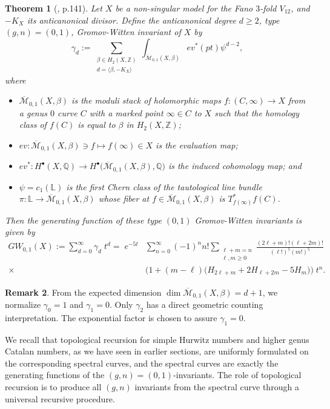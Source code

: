 \documentclass{amsart}
\newtheorem{thm}{Theorem}[section]
\theoremstyle{definition}
\newtheorem{rem}[thm]{Remark}
\numberwithin{equation}{section}
\numberwithin{figure}{section}
\def\b{\beta}
\def\gam{\gamma}
\newcommand{\be}{\begin{equation}}
\newcommand{\ee}{\end{equation}}
\newcommand{\Mbar}{{\overline{\mathcal{M}}}}
\newcommand{\bL}{{\mathbb{L}}}
\newcommand{\bQ}{{\mathbb{Q}}}
\newcommand{\bZ}{{\mathbb{Z}}}
\newcommand{\la}{{\langle}}
\newcommand{\ra}{{\rangle}}
\newcommand{\lrar}{\longrightarrow}
\newcommand{\bite}{\begin{itemize}}
\newcommand{\eite}{\end{itemize}}
\begin{document}
\begin{thm}[\cite{CCGK}, p.141] Let $X$ be a non-singular model
for the Fano $3$-fold $V_{12}$, and $-K_X$ its anticanonical divisor.
Define the anticanonical degree $d\ge 2$, type $(g,n)=(0,1)$, Gromov-Witten invariant of $X$ by
\be
\label{gam}
\gam_d:=\sum_{\substack{\beta\in H_2(X,\bZ)\\
d=\la \beta, -K_X\ra}}\int_{\Mbar_{0,1}(X, \b)} ev^*(pt) \psi^{d-2},
\ee
where 
\bite
\item
$\Mbar_{0,1}(X,\b)$ is the moduli stack of holomorphic maps
$f:(C,\infty)\lrar X$ from a genus $0$ curve $C$ with a marked point
$\infty\in C$ to $X$ such that the homology class of $f(C)$ is equal to $\beta$
in $H_2(X,\bZ)$;
\item $ev: \Mbar_{0,1}(X,\b)\owns f\longmapsto
f(\infty)\in X$ is the evaluation map;
\item $ev^*: H^\bullet (X,\bQ)
\lrar H^\bullet \big(\Mbar_{0,1}(X, \b),\bQ)$ is the induced cohomology 
map; and 
\item $\psi = c_1(\bL)$ is the first Chern class of the tautological 
line bundle $\pi: \bL\lrar \Mbar_{0,1}(X,\b)$
whose fiber at  $f\in \Mbar_{0,1}(X, \b)$ is $T^*_{f(\infty)} f(C)$.
\eite
Then the generating function of these type $(0,1)$ Gromov-Witten invariants 
is given by
\be
\begin{aligned}
\label{GWFano}
GW_{0,1}(X):=
\sum_{d=0}^\infty \gam_d\; t^d 
= \; e^{-5t} 
&\sum_{n=0}^\infty 
(-1)^n n! 
\sum_{\substack{\ell+m=n\\
\ell,m\ge 0}}
\frac{(2\ell+m)! (\ell+2m)!}
{(\ell !)^5  (m!)^5}
\\
\times &\bigg(1+(m-\ell)\big(H_{2\ell+m} 
+2H_{\ell + 2m} -5 H_m\big)\bigg) \;t^n.
\end{aligned}
\ee
\end{thm}

\begin{rem}
From the expected dimension $\dim \Mbar_{0,1}(X, \b)=d+1$,  we 
normalize $\gam_0=1$ and $\gam_1=0$. Only $\gam_2$ has a direct 
geometric counting interpretation.
The exponential factor is chosen to assure $\gam_1=0$.
\end{rem}

We recall that topological recursion 
for simple Hurwitz numbers and 
higher genus Catalan numbers, as we have seen in earlier sections,
 are uniformly formulated on the
corresponding spectral curves, and the spectral curves are exactly 
the generating functions of the $(g,n)=(0,1)$-invariants. 
The role of topological recursion is to produce all $(g,n)$ invariants
from the spectral curve through a universal recursive procedure. 
\end{document}
